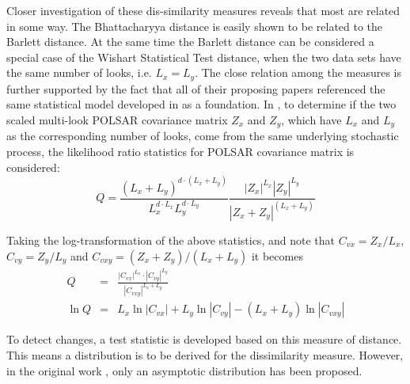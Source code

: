 \documentclass[journal]{IEEEtran}
\begin{document}
Closer investigation of these dis-similarity measures reveals that most are related in some way. %
The Bhattacharyya distance is easily shown to be related to the Barlett distance.
At the same time the Barlett distance can be considered a special case of the Wishart Statistical Test distance,
  when the two data sets have the same number of looks, i.e. $L_x=L_y$.
The close relation among the measures is further supported by the fact that
  all of their proposing papers referenced the same statistical model developed in \cite{Conradsen_2003_TGRS_4} as a foundation.
In \cite{Conradsen_2003_TGRS_4}, to determine if the two scaled multi-look POLSAR covariance matrix $Z_x$ and $Z_y$,
  which have $L_x$ and $L_y$ as the corresponding number of looks,
  come from the same underlying stochastic process,
the likelihood ratio statistics for POLSAR covariance matrix is considered:  
\begin{equation*}
  Q = \frac{(L_x+L_y)^{d \cdot (L_x+L_y)}}{L_x^{d \cdot L_x} L_y^{d \cdot L_y}} \frac{|Z_x|^{L_x} |Z_y|^{L_y} }{|Z_x+Z_y|^{(L_x+L_y)}}
\end{equation*}

Taking the log-transformation of the above statistics, and note that $C_{vx} = Z_x / L_x$, $C_{vy} = Z_y / L_y$ and $C_{vxy} = (Z_x + Z_y)/(L_x + L_y)$ it becomes 
\begin{eqnarray}
  Q &=& \frac{|C_{vx}|^{L_x} \cdot |C_{vy}|^{L_y} }{|C_{vxy}|^{L_x + L_y}} \label{eqn:ori_likelyhood_stats} \\
  \ln Q &=& L_x \ln |C_{vx}| + L_y \ln |C_{vy}| - (L_x + L_y) \ln |C_{vxy}| \label{eqn:log_likelyhood_stats}
\end{eqnarray}

To detect changes, a test statistic is developed based on this measure of distance.
This means a distribution is to be derived for the dissimilarity measure.
However, in the original work \cite{Conradsen_2003_TGRS_4}, only an asymptotic distribution has been proposed.
\end{document}
